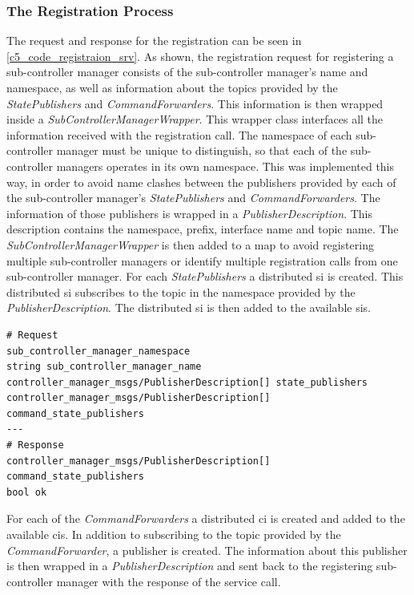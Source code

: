 \subsubsection{The Registration Process}
The request and response for the registration can be seen in \autoref{c5_code_registraion_srv}. As shown, the registration request for registering a sub-controller manager consists of the sub-controller manager's name and namespace, as well as information about the topics provided by the \textit{StatePublishers} and \textit{CommandForwarders}. This information is then wrapped inside a \textit{SubControllerManagerWrapper}. This wrapper class interfaces all the information received with the registration call. The namespace of each sub-controller manager must be unique to distinguish, so that each of the sub-controller managers operates in its own namespace. This was implemented this way, in order to avoid name clashes between the publishers provided by each of the sub-controller manager's \textit{StatePublishers} and \textit{CommandForwarders}. The information of those publishers is wrapped in a \textit{PublisherDescription}. This description contains the namespace, prefix, interface name and topic name. The  \textit{SubControllerManagerWrapper} is then added to a map to avoid registering multiple sub-controller managers or identify multiple registration calls from one sub-controller manager.\newline
For each \textit{StatePublishers} a distributed \gls{si} is created. This distributed \gls{si} subscribes to the topic in the namespace provided by the \textit{PublisherDescription}. The distributed \gls{si} is then added to the available \glspl{si}.
\lstset{language=C++,basicstyle=\small}
\begin{lstlisting}[caption=Request and response of the registraion service.,label=c5_code_registraion_srv]
# Request
sub_controller_manager_namespace
string sub_controller_manager_name
controller_manager_msgs/PublisherDescription[] state_publishers
controller_manager_msgs/PublisherDescription[] command_state_publishers
---
# Response
controller_manager_msgs/PublisherDescription[] command_state_publishers
bool ok
\end{lstlisting}
For each of the \textit{CommandForwarders} a distributed \gls{ci} is created and added to the available \glspl{ci}. In addition to subscribing to the topic provided by the \textit{CommandForwarder}, a publisher is created. The information about this publisher is then wrapped in a \textit{PublisherDescription} and sent back to the registering sub-controller manager with the response of the service call. 

